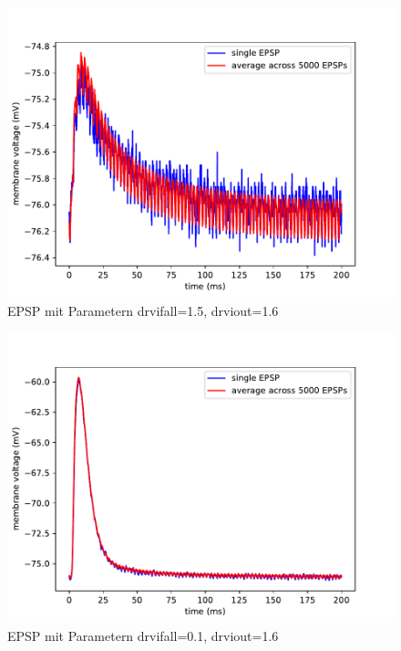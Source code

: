 \documentclass[10pt,a4paper]{scrartcl}
\begin{document}
\begin{figure} [ht]
\begin{center}
\label{fig:abb6}
\caption{EPSP mit Parametern drvifall=1.5, drviout=1.6}
\includegraphics[scale=0.35]{pictures/epsp_fall_1_5_out_1_6.pdf} 
\end{center}
\end{figure}

\begin{figure} [ht]
\begin{center}
\label{fig:abb7}
\caption{EPSP mit Parametern drvifall=0.1, drviout=1.6}
\includegraphics[scale=0.35]{pictures/epsp_fall_0_1_out_1_6.pdf} 
\end{center}
\end{figure}
\end{document}
